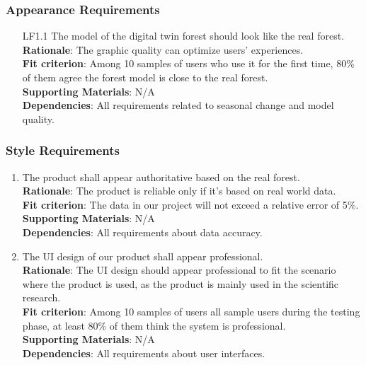 \documentclass{article}
\begin{document}
\subsubsection{Appearance Requirements}
\begin{enumerate}
\item[LF1.1] The model of the digital twin forest should 
look like the real forest.\\
\textbf{Rationale}: The graphic quality can optimize users'
experiences.\\
\textbf{Fit criterion}: Among 10 samples of users who use it 
for the first time,  80\% of them agree the forest model is
close to the real forest.\\
\textbf{Supporting Materials}: N/A\\
\textbf{Dependencies}: All requirements related to seasonal change and model quality.\\

\end{enumerate}
\subsubsection{Style Requirements}
\begin{enumerate}[LF2.1]
    \item The product shall appear authoritative based on the real forest.\\
    \textbf{Rationale}: The product is reliable only if it's based on real world data.\\
    \textbf{Fit criterion}: The data in our project will not exceed a relative error of 
    5\%.\\
\textbf{Supporting Materials}: N/A\\
\textbf{Dependencies}: All requirements about data accuracy.\\
    
    \item The UI design of our product shall appear professional.\\
    \textbf{Rationale}: The UI design should appear professional to fit the scenario where the product is used, as the product is mainly used in the scientific research.\\
    \textbf{Fit criterion}: Among 10 samples of users all sample users during the 
    testing phase, at least 80\% of them think the system is professional.\\
\textbf{Supporting Materials}: N/A\\
\textbf{Dependencies}: All requirements about user interfaces.\\

\end{enumerate}
\end{document}
